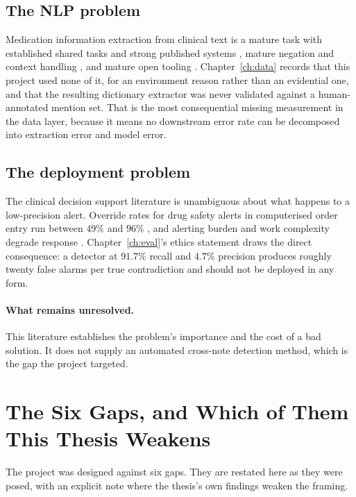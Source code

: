 \subsection{The NLP problem}

Medication information extraction from clinical text is a mature task with
established shared tasks and strong published systems
\citep{uzuner2010medication,henry2020n2c2}, mature negation and context handling
\citep{chapman2001negex}, and mature open tooling
\citep{neumann2019scispacy,eyre2021medspacy}. Chapter~\ref{ch:data} records that
this project used none of it, for an environment reason rather than an
evidential one, and that the resulting dictionary extractor was never validated
against a human-annotated mention set. That is the most consequential missing
measurement in the data layer, because it means no downstream error rate can be
decomposed into extraction error and model error.

\subsection{The deployment problem}

The clinical decision support literature is unambiguous about what happens to a
low-precision alert. Override rates for drug safety alerts in computerised order
entry run between $49\%$ and $96\%$ \citep{vandersijs2006overriding}, and
alerting burden and work complexity degrade response
\citep{ancker2017alertfatigue}. Chapter~\ref{ch:eval}'s ethics statement draws
the direct consequence: a detector at $91.7\%$ recall and $4.7\%$ precision
produces roughly twenty false alarms per true contradiction and should not be
deployed in any form.

\paragraph{What remains unresolved.} This literature establishes the problem's
importance and the cost of a bad solution. It does not supply an automated
cross-note detection method, which is the gap the project targeted.

\section{The Six Gaps, and Which of Them This Thesis Weakens}
\label{sec:bg-gaps}

The project was designed against six gaps. They are restated here as they were
posed, with an explicit note where the thesis's own findings weaken the framing.

